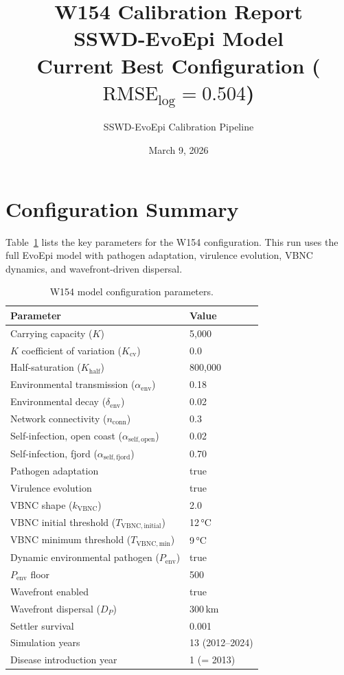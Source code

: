 \documentclass[11pt]{article}
\title{\textbf{W154 Calibration Report}\\[4pt]
\large SSWD-EvoEpi Model\\[6pt]
\normalsize Current Best Configuration ($\mathrm{RMSE_{log}} = 0.504$)}
\author{SSWD-EvoEpi Calibration Pipeline}
\date{March 9, 2026}
\begin{document}
\maketitle

\section{Configuration Summary}

Table~\ref{tab:config} lists the key parameters for the W154 configuration. This run uses the full EvoEpi model with pathogen adaptation, virulence evolution, VBNC dynamics, and wavefront-driven dispersal.

\begin{table}[H]
\centering
\caption{W154 model configuration parameters.}
\label{tab:config}
\begin{tabular}{ll}
\toprule
\textbf{Parameter} & \textbf{Value} \\
\midrule
Carrying capacity ($K$) & 5{,}000 \\
$K$ coefficient of variation ($K_\mathrm{cv}$) & 0.0 \\
Half-saturation ($K_\mathrm{half}$) & 800{,}000 \\
Environmental transmission ($\alpha_\mathrm{env}$) & 0.18 \\
Environmental decay ($\delta_\mathrm{env}$) & 0.02 \\
Network connectivity ($n_\mathrm{conn}$) & 0.3 \\
Self-infection, open coast ($\alpha_\mathrm{self,open}$) & 0.02 \\
Self-infection, fjord ($\alpha_\mathrm{self,fjord}$) & 0.70 \\
Pathogen adaptation & true \\
Virulence evolution & true \\
VBNC shape ($k_\mathrm{VBNC}$) & 2.0 \\
VBNC initial threshold ($T_\mathrm{VBNC,initial}$) & 12\,°C \\
VBNC minimum threshold ($T_\mathrm{VBNC,min}$) & 9\,°C \\
Dynamic environmental pathogen ($P_\mathrm{env}$) & true \\
$P_\mathrm{env}$ floor & 500 \\
Wavefront enabled & true \\
Wavefront dispersal ($D_P$) & 300\,km \\
Settler survival & 0.001 \\
Simulation years & 13 (2012--2024) \\
Disease introduction year & 1 (= 2013) \\
\bottomrule
\end{tabular}
\end{table}
\end{document}
